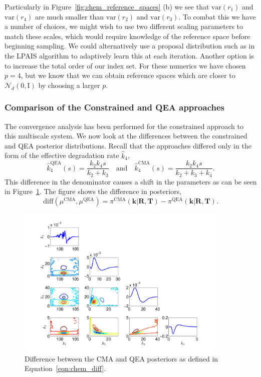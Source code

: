 \documentclass[final]{siamltex}
\begin{document}
Particularly in Figure~\ref{fig:chem_reference_spaces} (b) we see that $\text{var}(r_1)$ and $\text{var}(r_4)$ are much smaller than $\text{var}(r_2)$ and $\text{var}(r_3)$. To combat this we have a number of choices, we might wish to use two different scaling parameters to match these scales, which would require knowledge of the reference space before beginning sampling. We could alternatively use a proposal distribution such as in the LPAIS algorithm to adaptively learn this at each iteration. Another option is to increase the total order of our index set. For these numerics we have chosen $p=4$, but we know that we can obtain reference spaces which are closer to $\mathcal{N}_d(0, \text{I})$ by choosing a larger $p$.

\subsubsection{Comparison of the Constrained and QEA approaches}

The convergence analysis has been performed for the constrained approach to this multiscale system. We now look at the differences between the constrained and QEA posterior distributions. Recall that the approaches differed only in the form of the effective degradation rate $\hat{k}_4$,
\[
	\hat{k}_4^{\text{QEA}}(s) = \frac{k_2k_4s}{k_2+k_3} \quad \text{and} \quad \hat{k}_4^{\text{CMA}}(s) = \frac{k_2k_4s}{k_2+k_3+k_4}.
\]
This difference in the denominator causes a shift in the parameters as can be seen in Figure~\ref{fig:chem_diff}. The figure shows the difference in posteriors,
\begin{equation}\label{eqn:chem_diff}
	\text{diff}(\mu^{\text{CMA}}, \mu^{\text{QEA}}) = \pi^{\text{CMA}}(\mathbf{k}|\mathbf{R},\mathbf{T}) - \pi^{\text{QEA}}(\mathbf{k}|\mathbf{R},\mathbf{T}).
\end{equation}

\begin{figure}[htb]
\centering
\includegraphics[width=0.9\textwidth]{"images/Diff_CMA_QEA"}
\caption{Difference between the CMA and QEA posteriors as defined in Equation~\eqref{eqn:chem_diff}.}
\label{fig:chem_diff}
\end{figure}
\end{document}
